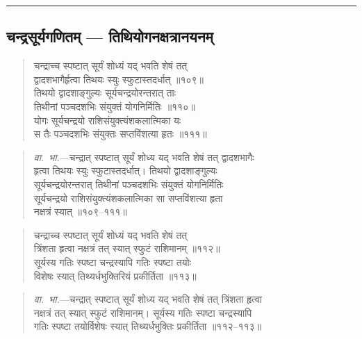 \documentclass[11pt,a4paper]{article}
\newcommand{\longline}{\noindent\rule{\textwidth}{0.4pt}}
\newcommand{\dev}[1]{{\devanagarifont #1}}
\newenvironment{shloka}{%
  \begin{quote}
  \small
  \setlength{\leftmargin}{2em}
  \devanagarifont
}{\end{quote}}
\newenvironment{vyakhya}{%
  \begin{quote}
  \small
  \setlength{\leftmargin}{1em}
  \devanagarifont
}{\end{quote}}
\newcommand{\skt}[1]{{\devanagarifont #1}}
\begin{document}
\longline

\subsection{\dev{चन्द्रसूर्यगणितम् — तिथियोगनक्षत्रानयनम्}}

\begin{shloka}
\skt{चन्द्राच्च स्पष्टात् सूर्यं शोध्यं यद् भवति शेषं तत्}\\[0.3em]
\skt{द्वादशभागैर्हृत्वा तिथयः स्युः स्फुटास्तदर्धात् ॥१०९॥}\\[0.3em]
\skt{तिथयो द्वादशाङ्गुल्यः सूर्यचन्द्रयोरन्तरात् ताः}\\[0.3em]
\skt{तिथीनां पञ्चदशभिः संयुक्तं योगनिर्मितिः ॥११०॥}\\[0.3em]
\skt{योगः सूर्यचन्द्रयो राशिसंयुक्त्यंशकलात्मिका यः}\\[0.3em]
\skt{स तैः पञ्चदशभिः संयुक्तः सप्तविंशत्या हृतः ॥१११॥}
\end{shloka}

\begin{vyakhya}
\textit{वा.~भा.}—\skt{चन्द्रात् स्पष्टात् सूर्यं शोध्य यद् भवति शेषं तत् द्वादशभागैः}\\
\skt{हृत्वा तिथयः स्युः स्फुटास्तदर्धात्। तिथयो द्वादशाङ्गुल्यः}\\
\skt{सूर्यचन्द्रयोरन्तरात् तिथीनां पञ्चदशभिः संयुक्तं योगनिर्मितिः}\\
\skt{सूर्यचन्द्रयो राशिसंयुक्त्यंशकलात्मिका सा सप्तविंशत्या हृता}\\
\skt{नक्षत्रं स्यात् ॥१०९--१११॥}
\end{vyakhya}

\begin{shloka}
\skt{चन्द्राच्च स्पष्टात् सूर्यं शोध्यं यद् भवति शेषं तत्}\\[0.3em]
\skt{त्रिंशता हृत्वा नक्षत्रं तत् स्यात् स्फुटं राशिमानम् ॥११२॥}\\[0.3em]
\skt{सूर्यस्य गतिः स्पष्टा चन्द्रस्यापि गतिः स्पष्टा तयोः}\\[0.3em]
\skt{विशेषः स्यात् तिथ्यर्धभुक्तिरियं प्रकीर्तिता ॥११३॥}
\end{shloka}

\begin{vyakhya}
\textit{वा.~भा.}—\skt{चन्द्रात् स्पष्टात् सूर्यं शोध्य यद् भवति शेषं तत् त्रिंशता हृत्वा}\\
\skt{नक्षत्रं तत् स्यात् स्फुटं राशिमानम्। सूर्यस्य गतिः स्पष्टा चन्द्रस्यापि}\\
\skt{गतिः स्पष्टा तयोर्विशेषः स्यात् तिथ्यर्धभुक्तिः प्रकीर्तिता ॥११२--११३॥}
\end{vyakhya}
\end{document}
